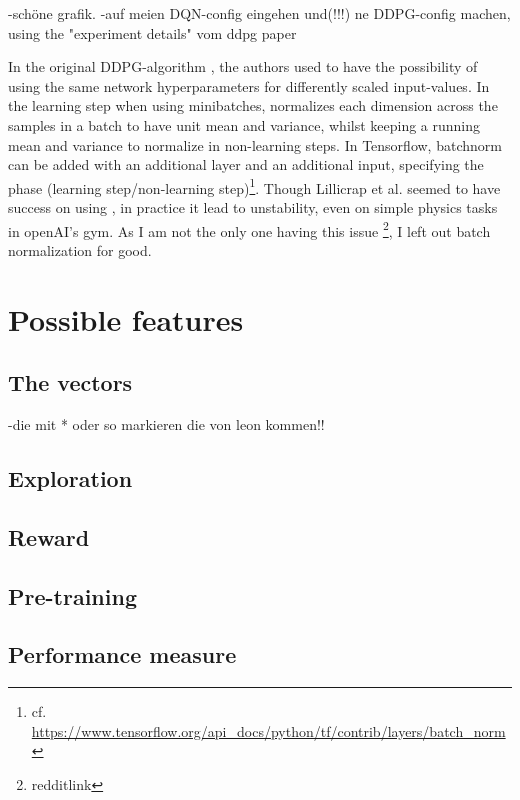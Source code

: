 -schöne grafik.
-auf meien DQN-config eingehen und(!!!) ne DDPG-config machen, using the "experiment details" vom ddpg paper  


In the original DDPG-algorithm \cite{lillicrap_continuous_2015}, the authors used  \cite{ioffe_batch_2015} to have the possibility of using the same network hyperparameters for differently scaled input-values. In the learning step when using minibatches, \batchnorm normalizes each dimension across the samples in a batch to have unit mean and variance, whilst keeping a running mean and variance to normalize in non-learning steps. In Tensorflow, batchnorm can be added with an additional layer and an additional input, specifying the phase (learning step/non-learning step)\footnote{cf. \url{https://www.tensorflow.org/api\_docs/python/tf/contrib/layers/batch_norm}}. Though Lillicrap et al. seemed to have success on using \batchnorm, in practice it lead to unstability, even on simple physics tasks in openAI's gym. As I am not the only one having this issue \footnote{redditlink}, I left out batch normalization for good.





\section{Possible features}

\subsection{The vectors}

\label{ch:thevectors}
-die mit * oder so markieren die von leon kommen!!


\subsection{Exploration}

\subsection{Reward}

\subsection{Pre-training}

\subsection{Performance measure}

